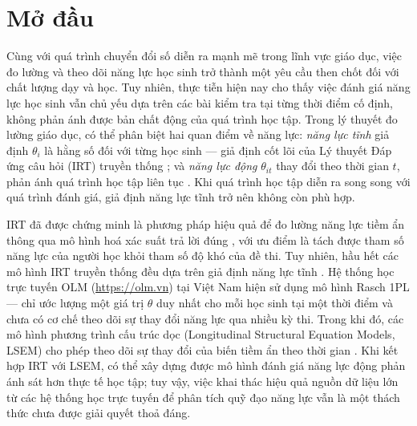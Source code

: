
\section{Mở đầu}
\label{sec:intro}

Cùng với quá trình chuyển đổi số diễn ra mạnh mẽ trong lĩnh vực giáo dục, việc đo lường và theo dõi năng lực học sinh trở thành một yêu cầu then chốt đối với chất lượng dạy và học. Tuy nhiên, thực tiễn hiện nay cho thấy việc đánh giá năng lực học sinh vẫn chủ yếu dựa trên các bài kiểm tra tại từng thời điểm cố định, không phản ánh được bản chất động của quá trình học tập. Trong lý thuyết đo lường giáo dục, có thể phân biệt hai quan điểm về năng lực: \emph{năng lực tĩnh} giả định \(\theta_i\) là hằng số đối với từng học sinh --- giả định cốt lõi của Lý thuyết Đáp ứng câu hỏi (IRT) truyền thống \cite{lord1980,hambleton1991}; và \emph{năng lực động} \(\theta_{it}\) thay đổi theo thời gian \(t\), phản ánh quá trình học tập liên tục \cite{kim2023,pengwei2022}. Khi quá trình học tập diễn ra song song với quá trình đánh giá, giả định năng lực tĩnh trở nên không còn phù hợp.

IRT đã được chứng minh là phương pháp hiệu quả để đo lường năng lực tiềm ẩn thông qua mô hình hoá xác suất trả lời đúng \cite{chalmers2012}, với ưu điểm là tách được tham số năng lực của người học khỏi tham số độ khó của đề thi. Tuy nhiên, hầu hết các mô hình IRT truyền thống đều dựa trên giả định năng lực tĩnh \cite{lord1980}. Hệ thống học trực tuyến OLM (\url{https://olm.vn}) tại Việt Nam hiện sử dụng mô hình Rasch 1PL --- chỉ ước lượng một giá trị \(\theta\) duy nhất cho mỗi học sinh tại một thời điểm và chưa có cơ chế theo dõi sự thay đổi năng lực qua nhiều kỳ thi. Trong khi đó, các mô hình phương trình cấu trúc dọc (Longitudinal Structural Equation Models, LSEM) cho phép theo dõi sự thay đổi của biến tiềm ẩn theo thời gian \cite{mcardle2009}. Khi kết hợp IRT với LSEM, có thể xây dựng được mô hình đánh giá năng lực động phản ánh sát hơn thực tế học tập; tuy vậy, việc khai thác hiệu quả nguồn dữ liệu lớn từ các hệ thống học trực tuyến để phân tích quỹ đạo năng lực vẫn là một thách thức chưa được giải quyết thoả đáng.

